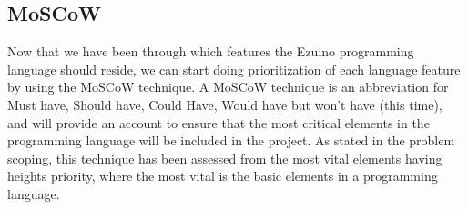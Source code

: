 \subsection{MoSCoW}
Now that we have been through which features the Ezuino programming language should reside, we can start doing prioritization of each language feature by using the MoSCoW technique. A MoSCoW technique is an abbreviation for Must have, Should have, Could Have, Would have but won't have (this time), and will provide an account to ensure that the most critical elements in the programming language will be included in the project. As stated in the problem scoping, this technique has been assessed from the most vital elements having heights priority, where the most vital is the basic elements in a programming language. 


